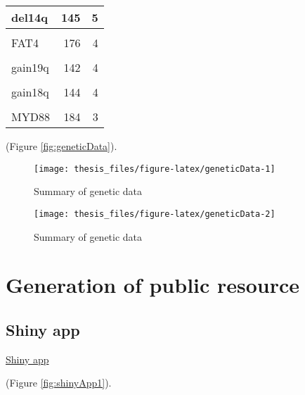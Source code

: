 \documentclass[11pt, a4paper, twosided]{book}
\begin{document}
\begin{table}
\begin{tabular}{l|r|r}
\hline
del14q & 145 & 5\\
\hline
\cellcolor[HTML]{E2E868}{IKZF3} & \cellcolor[HTML]{E2E868}{176} & \cellcolor[HTML]{E2E868}{4}\\
\hline
FAT4 & 176 & 4\\
\hline
\cellcolor[HTML]{E2E868}{EGR2} & \cellcolor[HTML]{E2E868}{176} & \cellcolor[HTML]{E2E868}{4}\\
\hline
gain19q & 142 & 4\\
\hline
\cellcolor[HTML]{E2E868}{gain19p} & \cellcolor[HTML]{E2E868}{142} & \cellcolor[HTML]{E2E868}{4}\\
\hline
gain18q & 144 & 4\\
\hline
\cellcolor[HTML]{E2E868}{del9q} & \cellcolor[HTML]{E2E868}{142} & \cellcolor[HTML]{E2E868}{4}\\
\hline
MYD88 & 184 & 3\\
\hline
\end{tabular}
\end{table}
(Figure \ref{fig:geneticData}).


\begin{figure}

{\centering \texttt{[image: thesis\_files/figure-latex/geneticData-1]} 

}

\caption{Summary of genetic data}\label{fig:geneticData-1}
\end{figure}
\begin{figure}

{\centering \texttt{[image: thesis\_files/figure-latex/geneticData-2]} 

}

\caption{Summary of genetic data}\label{fig:geneticData-2}
\end{figure}
\hypertarget{generation-of-public-resource}{%
\section{Generation of public resource}\label{generation-of-public-resource}}

\hypertarget{shiny-app}{%
\subsection{Shiny app}\label{shiny-app}}

\href{https://www.imbi.uni-heidelberg.de/dietrichlab/CLL_Microenvironment/}{Shiny app}

(Figure \ref{fig:shinyApp1}).
\end{document}
